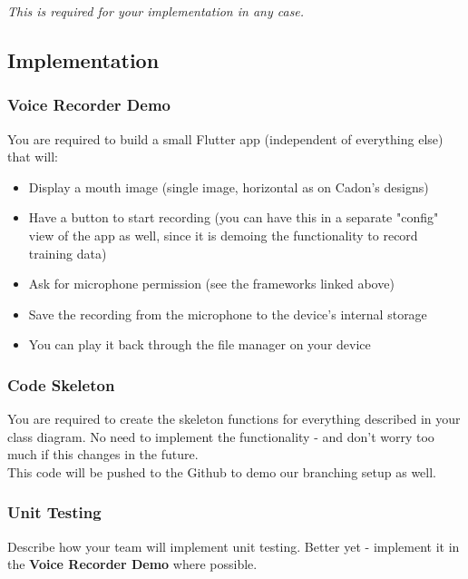 \documentclass{article}
\begin{document}
\begin{center}
   \textit{This is required for your implementation in any case.}
\end{center}

\newpage

\subsection{Implementation}
\subsubsection{Voice Recorder Demo}
You are required to build a small Flutter app (independent of everything else) that will:
\begin{itemize}
    \item Display a mouth image (single image, horizontal as on Cadon's designs)
    \item Have a button to start recording (you can have this in a separate "config" view of the app as well, since it is demoing the functionality to record training data)
    \item Ask for microphone permission (see the frameworks linked above)
    \item Save the recording from the microphone to the device's internal storage
    \item You can play it back through the file manager on your device
\end{itemize}

\subsubsection{Code Skeleton}
You are required to create the skeleton functions for everything described in your class diagram. No need to implement the functionality - and don't worry too much if this changes in the future. \\

This code will be pushed to the Github to demo our branching setup as well.

\subsubsection{Unit Testing}
Describe how your team will implement unit testing. Better yet - implement it in the \textbf{Voice Recorder Demo} where possible.
\end{document}
